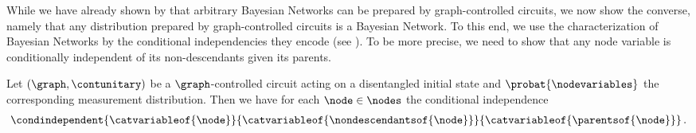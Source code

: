 While we have already shown by  that arbitrary Bayesian Networks can be prepared by graph-controlled circuits, we now show the converse, namely that any distribution prepared by graph-controlled circuits is a Bayesian Network.
To this end, we use the characterization of Bayesian Networks by the conditional independencies they encode (see \cite{koller_probabilistic_2009}).
To be more precise, we need to show that any node variable is conditionally independent of its non-descendants given its parents.

\begin{lemma}
    \label{lem:GCCtoBN}
    Let $(\graph,\contunitary)$ be a $\graph$-controlled circuit acting on a disentangled initial state and $\probat{\nodevariables}$ the corresponding measurement distribution.
    Then we have for each $\node\in\nodes$ the conditional independence
    \begin{align*}
        \condindependent{\catvariableof{\node}}{\catvariableof{\nondescendantsof{\node}}}{\catvariableof{\parentsof{\node}}} \, .
    \end{align*}
\end{lemma}
